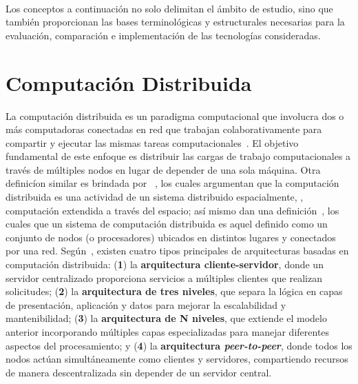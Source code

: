 \label{cap:marcoConceptual}
\mbox{}\\

\noindent
Los conceptos a continuación no solo delimitan el ámbito de estudio, sino que también proporcionan las bases terminológicas y estructurales necesarias para la evaluación, comparación e implementación de las tecnologías consideradas.

\noindent
\section{Computación Distribuida}
\noindent
La computación distribuida es un paradigma computacional que involucra dos o más computadoras conectadas en red que trabajan colaborativamente para compartir y ejecutar las mismas tareas computacionales~\citep{Ali2015}. El objetivo fundamental de este enfoque es distribuir las cargas de trabajo computacionales a través de múltiples nodos en lugar de depender de una sola máquina. Otra definicíon similar es brindada por ~\cite{Lamport1990}, los cuales argumentan que la computación distribuida es una actividad  de un sistema distribuido espacialmente, \ie, computación extendida a través del espacio; así mismo dan una definición~\cite{Chang1995}, los cuales  que un sistema de computación distribuida es aquel definido como un conjunto de nodos (o procesadores) ubicados en distintos lugares y conectados por una red. Según~\cite{AWS01}, existen cuatro tipos principales de arquitecturas basadas en computación distribuida: (\textbf{1}) la \textbf{arquitectura cliente-servidor}, donde un servidor centralizado proporciona servicios a múltiples clientes que realizan solicitudes; (\textbf{2}) la \textbf{arquitectura de tres niveles}, que separa la lógica en capas de presentación, aplicación y datos para mejorar la escalabilidad y mantenibilidad; (\textbf{3}) la \textbf{arquitectura de N niveles}, que extiende el modelo anterior incorporando múltiples capas especializadas para manejar diferentes aspectos del procesamiento; y (\textbf{4}) la \textbf{arquitectura \textit{peer-to-peer}}, donde todos los nodos actúan simultáneamente como clientes y servidores, compartiendo recursos de manera descentralizada sin depender de un servidor central.

